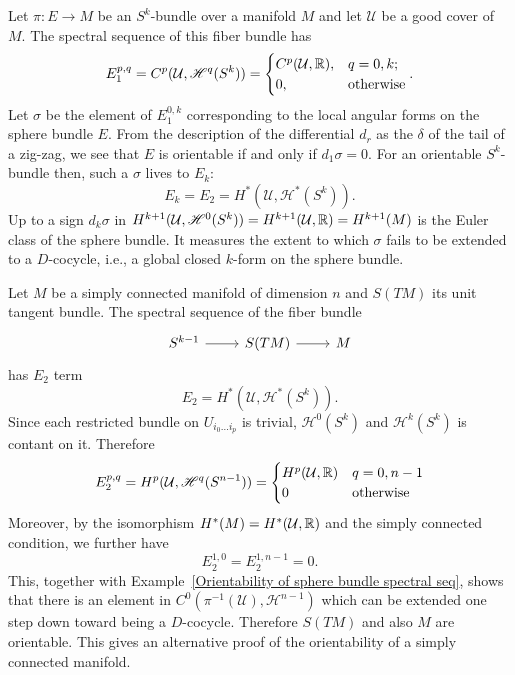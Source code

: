 \begin{example}\label{Orientability of sphere bundle spectral seq}
Let $\pi:E\to M$ be an $S^k$-bundle over a manifold $M$ and let $\mathcal{U}$ be a good cover of $M$. The spectral sequence of this fiber bundle has
\[E_1^{p,q}=C^p(\mathcal{U},\mathscr{H}^q(S^k))=\begin{cases}
C^p(\mathcal{U},\mathbb{R}),&q=0,k;\\
0,&\text{otherwise}
\end{cases}.\]
Let $\sigma$ be the element of $E_1^{0,k}$ corresponding to the local angular forms on the sphere bundle $E$. From the description of the differential $d_r$ as the $\delta$ 
of the tail of a zig-zag, we see that $E$ is orientable if and only if $d_1\sigma=0$. For an orientable $S^k$-bundle then, such a $\sigma$ lives to $E_k$:
\[E_k=E_2=H^*(\mathcal{U},\mathscr{H}^*(S^k)).\]
Up to a sign $d_k\sigma$ in $H^{k+1}(\mathcal{U},\mathscr{H}^0(S^k))=H^{k+1}(\mathcal{U},\mathbb{R})=H^{k+1}(M)$ is the Euler class of the sphere bundle. It measures the extent 
to which $\sigma$ fails to be extended to a $D$-cocycle, i.e., a global closed $k$-form on the sphere bundle.
\end{example}
\begin{example}
Let $M$ be a simply connected manifold of dimension $n$ and $S(TM)$ its unit tangent bundle. The spectral sequence of the fiber bundle
\[\begin{tikzcd}
S^{k-1}\ar[r]&S(TM)\ar[r]&M
\end{tikzcd}\]
has $E_2$ term
\[E_2=H^*(\mathcal{U},\mathscr{H}^*(S^k)).\]
Since each restricted bundle on $U_{i_0\dots i_p}$ is trivial, $\mathscr{H}^0(S^k)$ and $\mathscr{H}^k(S^k)$ is contant on it. Therefore
\[E_2^{p,q}=H^p(\mathcal{U},\mathscr{H}^q(S^{n-1}))=\begin{cases}
H^p(\mathcal{U},\mathbb{R})&q=0,n-1\\
0&\text{otherwise}
\end{cases}\]
Moreover, by the isomorphism $H^*(M)=H^*(\mathcal{U},\mathbb{R})$ and the simply connected condition, we further have
\[E_2^{1,0}=E_2^{1,n-1}=0.\]
This, together with Example~\ref{Orientability of sphere bundle spectral seq}, shows that there is an element in $C^0(\pi^{-1}(\mathcal{U}),\mathscr{H}^{n-1})$ which 
can be extended one step down toward being a $D$-cocycle. Therefore $S(TM)$ and also $M$ are orientable. This gives an alternative proof of the orientability of a simply 
connected manifold.
\end{example}
